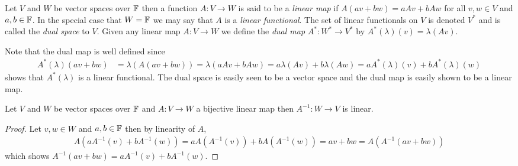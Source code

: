 \begin{defn}Let $V$ and $W$ be vector spaces over $\mathbb{F}$ then a function $A : V \to W$ is said to be a \emph{linear map} if $A (av + bw) = aAv + bAw$ for all $v,w \in V$ and $a,b \in \mathbb{F}$.  In the special case that $W = \mathbb{F}$ we may say that $A$ is a \emph{linear functional}.  The set of linear functionals on $V$ is denoted $V^*$ and is called the \emph{dual space} to $V$.  Given any linear map $A : V \to W$ we define the \emph{dual map} $A^* : W^* \to V^*$ by $A^*(\lambda)(v)= \lambda(Av)$.  
\end{defn}
Note that the dual map is well defined since 
\begin{align*}
A^*(\lambda)(av + bw) &= \lambda(A(av+bw)) = \lambda(aAv + b A w) = a \lambda(Av) + b\lambda(Aw) = aA^*(\lambda)(v) + b A^*(\lambda)(w)
\end{align*}
shows that $A^*(\lambda)$ is a linear functional.  The dual space is easily seen to be a vector space and the dual map is easily shown to be a linear map.

\begin{prop}\label{linear:LinearityOfInverse}Let $V$ and $W$ be vector spaces over $\mathbb{F}$ and  $A : V \to W$ a bijective linear map then $A^{-1} : W \to V$ is linear.
\end{prop}
\begin{proof}
Let $v,w \in W$ and $a,b \in \mathbb{F}$ then by linearity of $A$,
\begin{align*}
A (a A^{-1}(v) + b A^{-1} (w)) = a A(A^{-1}(v)) + b A(A^{-1}(w)) = a v + b w = A(A^{-1}( av + b w))
\end{align*}
which shows $A^{-1}( av + b w) = a A^{-1}(v) + b A^{-1} (w)$.
\end{proof}

